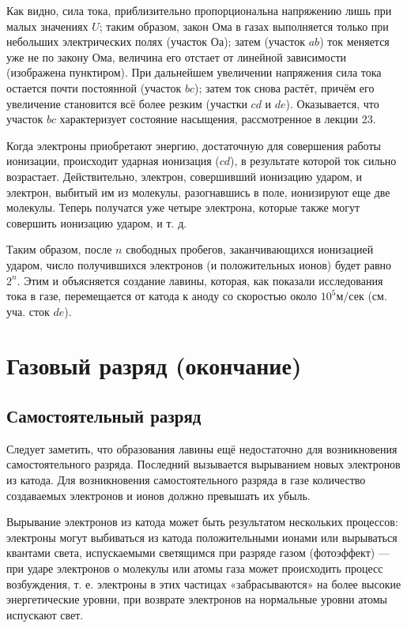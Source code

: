 \documentclass[a4paper,10pt]{book}
\begin{document}
Как видно, сила тока, приблизительно пропорциональна напряжению лишь при малых значениях $U$; таким образом, закон Ома в газах выполняется только при небольших электрических полях (участок $Оа$); затем (участок $ab$) ток меняется уже не по закону Ома, величина его отстает от линейной зависимости (изображена пунктиром). При дальнейшем увеличении напряжения сила тока остается почти постоянной (участок $bc$); затем ток снова растёт, причём его увеличение становится всё более резким (участки $cd$ и $de$). Оказывается, что участок $bc$ характеризует состояние насыщения, рассмотренное в лекции 23.

Когда электроны приобретают энергию, достаточную для совершения работы ионизации, происходит ударная ионизация ($cd$), в результате которой ток сильно возрастает. Действительно, электрон, совершивший ионизацию ударом, и электрон, выбитый им из молекулы, разогнавшись в поле, ионизируют еще две молекулы. Теперь получатся уже четыре электрона, которые также могут совершить ионизацию ударом, и т. д.

Таким образом, после $n$ свободных пробегов, заканчивающихся ионизацией ударом, число получившихся электронов (и положительных ионов) будет равно $2^n$. Этим и объясняется создание лавины, которая, как показали исследования тока в газе, перемещается от катода к аноду со скоростью около $10^5 \textit{м/сек}$ (см. уча. сток $de$).

\chapter{Газовый разряд (окончание)}
\section{Самостоятельный разряд}
Следует заметить, что образования лавины ещё недостаточно для возникновения самостоятельного разряда. Последний вызывается вырыванием новых электронов из катода. Для возникновения самостоятельного разряда в газе количество создаваемых электронов и ионов должно превышать их убыль.

Вырывание электронов из катода может быть результатом нескольких процессов: электроны могут выбиваться из катода положительными ионами или вырываться квантами света, испускаемыми светящимся при разряде газом (фотоэффект) — при ударе электронов о молекулы или атомы газа может происходить процесс возбуждения, т. е. электроны в этих частицах «забрасываются» на более высокие энергетические уровни, при возврате электронов на нормальные уровни атомы испускают свет.
\end{document}
